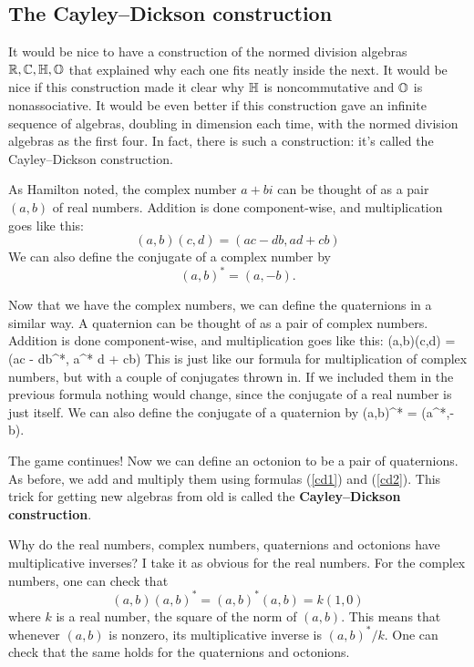 \subsection{The Cayley--Dickson construction}  \label{cayley-dickson}   
   
It would be nice to have a construction of the normed division algebras   
${\mathbb R},{\mathbb C},{\mathbb H},{\mathbb O}$ that explained why each one fits neatly inside the next.   
It would be nice if this construction made it clear why ${\mathbb H}$ is   
noncommutative and ${\mathbb O}$ is nonassociative.  It would be even better if   
this construction gave an infinite sequence of algebras, doubling in   
dimension each time, with the normed division algebras as the first   
four.  In fact, there is such a construction: it's called the   
Cayley--Dickson construction.   
   
As Hamilton noted, the complex number $a+bi$ can be thought of as a pair
$(a,b)$ of real numbers.  Addition is done component-wise, and
multiplication goes like this:
\[            (a,b)(c,d) = (ac - db,ad + cb)   \]   
We can also define the conjugate of a complex number by   
\[                (a,b)^* = (a,-b).   \]   
   
Now that we have the complex numbers, we can define the   
quaternions in a similar way.  A quaternion can be thought of    
as a pair of complex numbers.  Addition is done component-wise,   
and multiplication goes like this:   
\be          (a,b)(c,d) = (ac - db^*, a^* d + cb)      \label{cd1} \ee   
This is just like our formula for multiplication of complex numbers, but
with a couple of conjugates thrown in.  If we included them in 
the previous formula nothing would change, since the conjugate of a
real number is just itself.  We can also define the conjugate of a
quaternion by
\be          (a,b)^* = (a^*,-b).        \label{cd2} \ee   
   
The game continues!  Now we can define an octonion to be a pair of
quaternions.  As before, we add and multiply them using formulas
(\ref{cd1}) and (\ref{cd2}).  This trick for getting new algebras from
old is called the {\bf Cayley--Dickson construction}.
   
Why do the real numbers, complex numbers, quaternions   
and octonions have multiplicative inverses?  I take it as   
obvious for the real numbers.  For the complex numbers,    
one can check that   
\[    (a,b) (a,b)^* = (a,b)^* (a,b) = k (1,0)  \]   
where $k$ is a real number, the square of the norm of $(a,b)$.     
This means that whenever $(a,b)$ is nonzero, its multiplicative    
inverse is $(a,b)^*/k$.  One can check that the same holds for the    
quaternions and octonions.   
   
